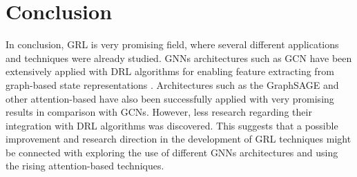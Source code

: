 \begin{comment}
	GCN
	
	\cite{yanGraphCooperationDeep2023} & GCN-DQN & GRU, Multi-agent and Multi-head Attention & Ecological Traffic Signal Control \\ \hline
	
	\cite{luoMultiAgentCollaborativeExploration2019} & GCN-DQN & & Autonomous Exploration under uncertainty \\ \hline
	
	Attention
	\cite{huMultiagentGraphReinforcement2024} & HRGN-MASAC & Multi-agent Vol-VAR Regulation \\ \hline
	
\end{comment}

\section{Conclusion}

In conclusion, \ac{GRL} is very promising field, where several different applications and techniques were already studied. \acp{GNN} architectures such as \ac{GCN} have been extensively applied with DRL algorithms for enabling feature extracting from graph-based state representations \cite{chenScalableGraphReinforcement2023, chenAutonomousExplorationUncertainty2020}. Architectures such as the GraphSAGE and other attention-based have also been successfully applied with very promising results \cite{peiEmergencyControlStrategy2023, xingRealtimeOptimalScheduling2023} in comparison with \acp{GCN}. However, less research regarding their integration with DRL algorithms was discovered. This suggests that a possible improvement and research direction in the development of \ac{GRL} techniques might be connected with exploring the use of different \acp{GNN} architectures and using the rising attention-based techniques.

